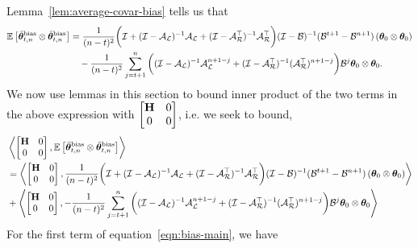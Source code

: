 	Lemma~\ref{lem:average-covar-bias} tells us that
	\begin{align}
		\E{\thetavb^{\textrm{bias}} \otimes \thetavb^{\text{bias}}} &= \frac{1}{(n-t)^2} \bigg( \eyeT + (\eyeT-\AL)^{-1}\AL + (\eyeT-\AR\T)^{-1}\AR\T\bigg) (\eyeT-\BT)^{-1}(\BT^{t+1}-\BT^{n+1}) \left(\thetat[0]\otimes \thetat[0]\right) \nonumber \\	 &\quad -\frac{1}{(n-t)^2}\sum_{j=t+1}^n\bigg( (\eyeT-\AL)^{-1}\AL^{n+1-j} + (\eyeT-\AR\T)^{-1}(\AR\T)^{n+1-j} \bigg)\BT^j \thetat[0] \otimes \thetat[0] . \label{eqn:bias-main-1}
	\end{align}
	We now use lemmas in this section to bound inner product of the two terms in the above expression with $\begin{bmatrix}\H&0\\0&0\end{bmatrix}$, i.e. we seek to bound,
	\begin{align}
		&\iprod{\begin{bmatrix}\H&0\\0&0\end{bmatrix}}{\E{\thetavb^{\textrm{bias}} \otimes \thetavb^{\text{bias}}}}\nonumber\\ &=\iprod{\begin{bmatrix}\H&0\\0&0\end{bmatrix}}{\frac{1}{(n-t)^2} \bigg( \eyeT + (\eyeT-\AL)^{-1}\AL + (\eyeT-\AR\T)^{-1}\AR\T\bigg) (\eyeT-\BT)^{-1}(\BT^{t+1}-\BT^{n+1}) \left(\thetat[0]\otimes \thetat[0]\right)}\nonumber\\
&+\iprod{\begin{bmatrix}\H&0\\0&0\end{bmatrix}}{-\frac{1}{(n-t)^2}\sum_{j=t+1}^n\bigg( (\eyeT-\AL)^{-1}\AL^{n+1-j} + (\eyeT-\AR\T)^{-1}(\AR\T)^{n+1-j} \bigg)\BT^j \thetat[0] \otimes \thetat[0]}\label{eqn:bias-main}
	\end{align}
	For the first term of equation~\ref{eqn:bias-main}, we have
